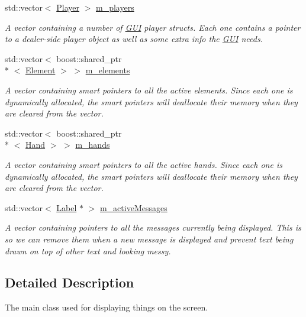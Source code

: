 \begin{DoxyCompactItemize}
std\-::vector$<$ \hyperlink{structGUI_1_1Player}{Player} $>$ \hyperlink{classGUI_1_1DealerGUI_a387c683523139e78c1b9d662d4062044}{m\-\_\-players}
\begin{DoxyCompactList}\small\item\em A vector containing a number of \hyperlink{namespaceGUI}{G\-U\-I} player structs. Each one contains a pointer to a dealer-\/side player object as well as some extra info the \hyperlink{namespaceGUI}{G\-U\-I} needs. \end{DoxyCompactList}\item 
std\-::vector$<$ boost\-::shared\-\_\-ptr\\*
$<$ \hyperlink{classGUI_1_1Element}{Element} $>$ $>$ \hyperlink{classGUI_1_1DealerGUI_a6985ea1998d7070d905953d7032701a8}{m\-\_\-elements}
\begin{DoxyCompactList}\small\item\em A vector containing smart pointers to all the active elements. Since each one is dynamically allocated, the smart pointers will deallocate their memory when they are cleared from the vector. \end{DoxyCompactList}\item 
std\-::vector$<$ boost\-::shared\-\_\-ptr\\*
$<$ \hyperlink{classGUI_1_1Hand}{Hand} $>$ $>$ \hyperlink{classGUI_1_1DealerGUI_ac4d414e9b6f32e1b2fc69d861d7f9244}{m\-\_\-hands}
\begin{DoxyCompactList}\small\item\em A vector containing smart pointers to all the active hands. Since each one is dynamically allocated, the smart pointers will deallocate their memory when they are cleared from the vector. \end{DoxyCompactList}\item 
std\-::vector$<$ \hyperlink{classGUI_1_1Label}{Label} $\ast$ $>$ \hyperlink{classGUI_1_1DealerGUI_a9f528201ce3d04aba77c56a6370815dd}{m\-\_\-active\-Messages}
\begin{DoxyCompactList}\small\item\em A vector containing pointers to all the messages currently being displayed. This is so we can remove them when a new message is displayed and prevent text being drawn on top of other text and looking messy. \end{DoxyCompactList}\end{DoxyCompactItemize}


\subsection{Detailed Description}
The main class used for displaying things on the screen. 


